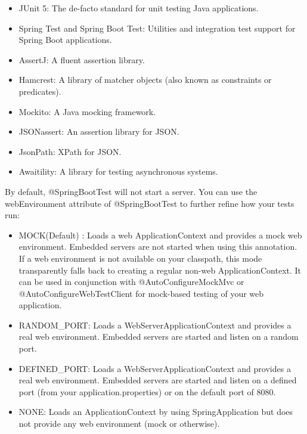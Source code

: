 \documentclass{scrartcl}
\begin{document}
\begin{itemize}
    \item JUnit 5: The de-facto standard for unit testing Java applications.

    \item Spring Test and Spring Boot Test: Utilities and integration test support for Spring Boot applications.

    \item AssertJ: A fluent assertion library.

    \item Hamcrest: A library of matcher objects (also known as constraints or predicates).

    \item Mockito: A Java mocking framework.

    \item JSONassert: An assertion library for JSON.

    \item JsonPath: XPath for JSON.

    \item Awaitility: A library for testing asynchronous systems.

\end{itemize}

By default, @SpringBootTest will not start a server. You can use the webEnvironment attribute of @SpringBootTest to further refine how your tests run:

\begin{itemize}
    \item MOCK(Default) : Loads a web ApplicationContext and provides a mock web environment. Embedded servers are not started when using this annotation. If a web environment is not available on your classpath, this mode transparently falls back to creating a regular non-web ApplicationContext. It can be used in conjunction with @AutoConfigureMockMvc or @AutoConfigureWebTestClient for mock-based testing of your web application.

    \item RANDOM\_PORT: Loads a WebServerApplicationContext and provides a real web environment. Embedded servers are started and listen on a random port.

    \item DEFINED\_PORT: Loads a WebServerApplicationContext and provides a real web environment. Embedded servers are started and listen on a defined port (from your application.properties) or on the default port of 8080.

    \item NONE: Loads an ApplicationContext by using SpringApplication but does not provide any web environment (mock or otherwise).
\end{itemize}
\end{document}
